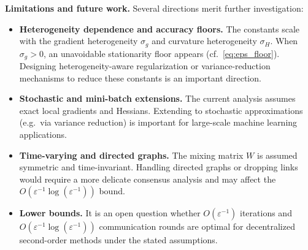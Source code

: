 \documentclass[11pt,a4paper]{article}
\def\cO{O}%
\newcommand{\cO}{\mathcal{O}}
\begin{document}
	\noindent\textbf{Limitations and future work.}
	Several directions merit further investigation:
	\begin{itemize}[leftmargin=1.2em,itemsep=2pt]
		\item \textbf{Heterogeneity dependence and accuracy floors.}
		The constants scale with the gradient heterogeneity $\sigma_g$ and curvature heterogeneity $\sigma_H$.
		When $\sigma_g>0$, an unavoidable stationarity floor appears (cf.\ \eqref{eq:eps_floor}).
		Designing heterogeneity-aware regularization or variance-reduction mechanisms to reduce these constants is an important direction.
		\item \textbf{Stochastic and mini-batch extensions.}
		The current analysis assumes exact local gradients and Hessians.
		Extending to stochastic approximations (e.g.\ via variance reduction) is important
		for large-scale machine learning applications.
		\item \textbf{Time-varying and directed graphs.}
		The mixing matrix $W$ is assumed symmetric and time-invariant.
		Handling directed graphs or dropping links would require a more delicate consensus
		analysis and may affect the $\cO(\varepsilon^{-1}\log(\varepsilon^{-1}))$ bound.
		\item \textbf{Lower bounds.}
		It is an open question whether $\cO(\varepsilon^{-1})$ iterations and
		$\cO(\varepsilon^{-1}\log(\varepsilon^{-1}))$ communication rounds are optimal for
		decentralized second-order methods under the stated assumptions.
	\end{itemize}
	
\end{document}

